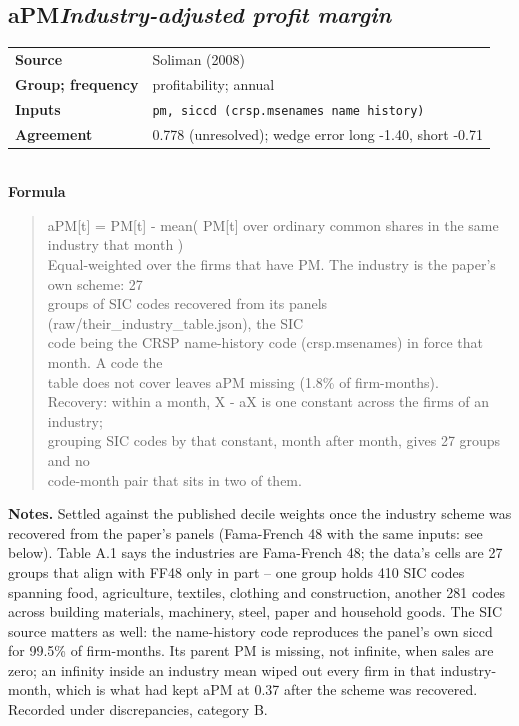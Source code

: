 \documentclass[11pt]{article}
\begin{document}
\subsection*{aPM\quad\normalfont\itshape Industry-adjusted profit margin}
\begin{tabular}{@{}p{3.3cm}p{12.3cm}@{}}
\textbf{Source} & Soliman (2008)\\
\textbf{Group; frequency} & profitability; annual\\
\textbf{Inputs} & \texttt{pm, siccd (crsp.msenames name history)}\\
\textbf{Agreement} & 0.778 (unresolved); wedge error long -1.40, short -0.71\\
\end{tabular}\\[4pt]
\textbf{Formula}
\begin{quote}\small
aPM[t] = PM[t] - mean( PM[t] over ordinary common shares in the same industry that month )\\
Equal-weighted over the firms that have PM. The industry is the paper's own scheme: 27\\
groups of SIC codes recovered from its panels (raw/their\_industry\_table.json), the SIC\\
code being the CRSP name-history code (crsp.msenames) in force that month. A code the\\
table does not cover leaves aPM missing (1.8\% of firm-months).\\
Recovery: within a month, X - aX is one constant across the firms of an industry;\\
grouping SIC codes by that constant, month after month, gives 27 groups and no\\
code-month pair that sits in two of them.\\

\end{quote}
\textbf{Notes.} Settled against the published decile weights once the industry scheme was recovered from the paper's panels (Fama-French 48 with the same inputs: see below). Table A.1 says the industries are Fama-French 48; the data's cells are 27 groups that align with FF48 only in part -- one group holds 410 SIC codes spanning food, agriculture, textiles, clothing and construction, another 281 codes across building materials, machinery, steel, paper and household goods. The SIC source matters as well: the name-history code reproduces the panel's own siccd for 99.5\% of firm-months. Its parent PM is missing, not infinite, when sales are zero; an infinity inside an industry mean wiped out every firm in that industry-month, which is what had kept aPM at 0.37 after the scheme was recovered. Recorded under discrepancies, category B.
\end{document}
